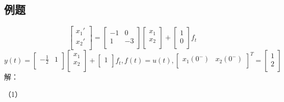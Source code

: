\documentclass[UTF8]{ctexart}
\begin{document}
\subsection{例题}
\begin{equation}
  \left[   
     \begin{matrix}
     x_1' \\
     x_2' \\
     \end{matrix}
   \right]
   =  \left[   
     \begin{matrix}
     -1 &  0   \\
     1 &  -3   \\
     \end{matrix}
   \right]
   \left[   
    \begin{matrix}
    x_1 \\
    x_2 \\
    \end{matrix}
  \right]
  +\left[   
    \begin{matrix}
    1 \\
    0 \\
    \end{matrix}
  \right] f_t
  \nonumber
 \end{equation}
 \begin{equation}
   y(t)=  \left[   
     \begin{matrix}
     -\frac{1}{2} &  1   \\
     \end{matrix}
   \right]
   \left[   
    \begin{matrix}
    x_1 \\
    x_2 \\
    \end{matrix}
  \right]
  +\left[   
    \begin{matrix}
    1 \\
    \end{matrix}
  \right] f_t ,f(t)=u(t),
  \left[   
    \begin{matrix}
    x_1(0^-) & x_2(0^-) \\
    \end{matrix}
  \right]^T=
  \left[   
    \begin{matrix}
    1 \\
    2 \\
    \end{matrix}
  \right]
  \nonumber
 \end{equation}
 解： \par
 （1） \par
\end{document}
